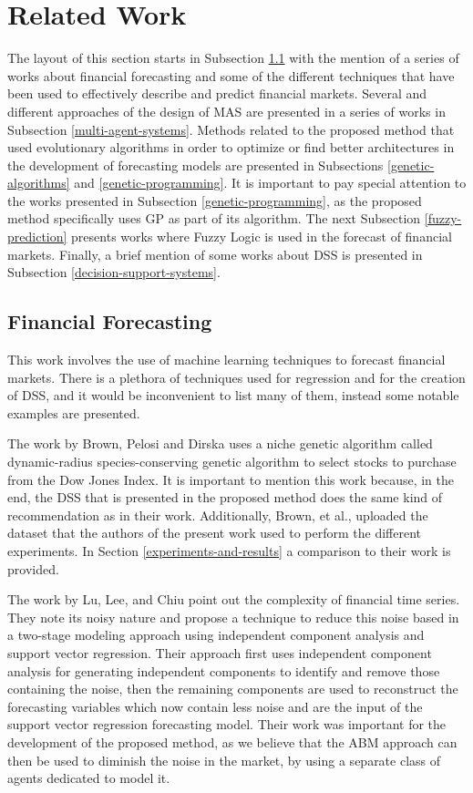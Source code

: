 \section{Related Work}
\label{related-work}

The layout of this section starts in Subsection \ref{financial-forecasting} with the mention of a series of works about financial forecasting and some of the different techniques that have been used to effectively describe and predict financial markets. Several and different approaches of the design of MAS are presented in a series of works in Subsection \ref{multi-agent-systems}. Methods related to the proposed method that used evolutionary algorithms in order to optimize or find better architectures in the development of forecasting models are presented in Subsections \ref{genetic-algorithms} and \ref{genetic-programming}. It is important to pay special attention to the works presented in Subsection \ref{genetic-programming}, as the proposed method specifically uses GP as part of its algorithm. The next Subsection \ref{fuzzy-prediction} presents works where Fuzzy Logic is used in the forecast of financial markets. Finally, a brief mention of some works about DSS is presented in Subsection \ref{decision-support-systems}.

\subsection{Financial Forecasting}
\label{financial-forecasting}

This work involves the use of machine learning techniques to forecast financial markets. There is a plethora of techniques used for regression and for the creation of DSS, and it would be inconvenient to list many of them, instead some notable examples are presented.

The work by Brown, Pelosi and Dirska \cite{brown2013dynamic} uses a niche genetic algorithm called dynamic-radius species-conserving genetic algorithm to select stocks to purchase from the Dow Jones Index. It is important to mention this work because, in the end, the DSS that is presented in the proposed method does the same kind of recommendation as in their work. Additionally, Brown, et al., uploaded the dataset that the authors of the present work used to perform the different experiments. In Section \ref{experiments-and-results} a comparison to their work is provided.

The work by Lu, Lee, and Chiu \cite{Lu2009} point out the complexity of financial time series. They note its noisy nature and propose a technique to reduce this noise based in a two-stage modeling approach using independent component analysis and support vector regression. Their approach first uses independent component analysis for generating independent components to identify and remove those containing the noise, then the remaining components are used to reconstruct the forecasting variables which now contain less noise and are the input of the support vector regression forecasting model. Their work was important for the development of the proposed method, as we believe that the ABM approach can then be used to diminish the noise in the market, by using a separate class of agents dedicated to model it.

